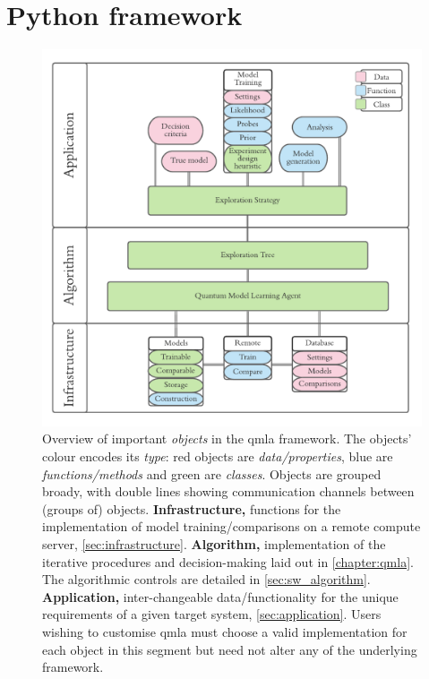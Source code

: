 \section{Python framework}
\begin{figure}
    \includegraphics{algorithms/figures/software_overview.pdf}
    \caption[QMLA codebase overview]{
        Overview of important \emph{objects} in the \gls{qmla} framework.
        The objects' colour encodes its \emph{type}: 
            red objects are \emph{data/properties},
            blue are \emph{functions/methods} 
            and green are \emph{classes}. 
        Objects are grouped broady, with double lines showing communication channels between (groups of) objects. 
        \textbf{Infrastructure,} functions for the implementation of model training/comparisons on 
            a remote compute server, \cref{sec:infrastructure}.
        \textbf{Algorithm,} implementation of the iterative procedures and decision-making 
        laid out in \cref{chapter:qmla}. The algorithmic controls are detailed in \cref{sec:sw_algorithm}. 
        \textbf{Application,} inter-changeable data/functionality for the unique requirements 
        of a given target system, \cref{sec:application}. 
        Users wishing to customise \gls{qmla} must choose a valid implementation for each object in this segment
            but need not alter any of the underlying framework.
    }
    \label{fig:software_overview}
\end{figure}

